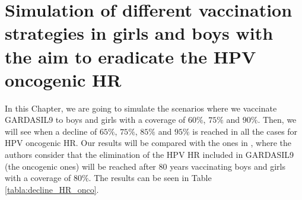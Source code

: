 \section{Simulation of different vaccination strategies in girls and boys with the aim to eradicate the HPV oncogenic HR}\label{vaccinationStrategies}
In this Chapter, we are going to simulate the scenarios where we vaccinate GARDASIL9 to boys and girls with a coverage of $60\%$, $75\%$ and $90\%$. Then, we will see when a decline of $65\%$, $75\%$, $85\%$ and $95\%$ is reached in all the cases for HPV oncogenic HR. Our results will be compared with the ones in \cite{Brisson2016}, where the authors consider that the elimination of the HPV HR included in GARDASIL9 (the oncogenic ones) will be reached after $80$ years vaccinating boys and girls with a coverage of $80\%$. The results can be seen in Table \ref{tabla:decline_HR_onco}.

